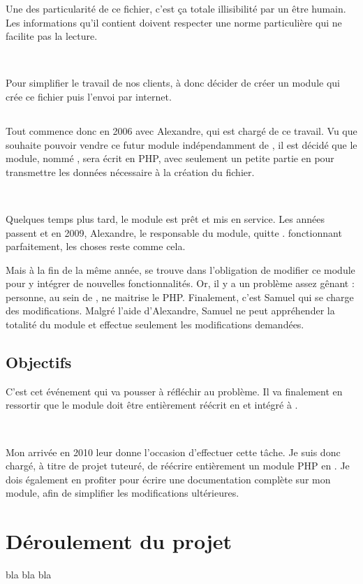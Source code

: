 Une des particularité de ce fichier, c'est ça totale illisibilité par un être humain. Les informations qu'il contient doivent respecter une norme particulière qui ne facilite pas la lecture.

~

Pour simplifier le travail de nos clients, \solulog{} à donc décider de créer un module qui crée ce fichier puis l'envoi par internet.

\subsection{\pireus}
Tout commence donc en 2006 avec Alexandre, qui est chargé de ce travail. Vu que \solulog{} souhaite pouvoir vendre ce futur module indépendamment de \integrale, il est décidé que le module, nommé \emph{\pireus}, sera écrit en PHP, avec seulement un petite partie en \vb{} pour transmettre les données nécessaire à la création du fichier.

~

Quelques temps plus tard, le module est prêt et mis en service. Les années passent et en 2009, Alexandre, le responsable du module, quitte \solulog. \pireus fonctionnant parfaitement, les choses reste comme cela.

Mais à la fin de la même année, \solulog{} se trouve dans l'obligation de modifier ce module pour y intégrer de nouvelles fonctionnalités. Or, il y a un problème assez gênant : personne, au sein de \solulog, ne maitrise le PHP. Finalement, c'est Samuel qui se charge des modifications. Malgré l'aide d'Alexandre, Samuel ne peut appréhender la totalité du module et effectue seulement les modifications demandées.

\subsection{Objectifs}
C'est cet événement qui va pousser \solulog{} à réfléchir au problème. Il va finalement en ressortir que le module doit être entièrement réécrit en \vb{} et intégré à \integrale.

~

Mon arrivée en 2010 leur donne l'occasion d'effectuer cette tâche. Je suis donc chargé, à titre de projet tuteuré, de réécrire entièrement un module PHP en \vb. Je dois également en profiter pour écrire une documentation complète sur mon module, afin de simplifier les modifications ultérieures.

\section{Déroulement du projet}
bla bla bla
